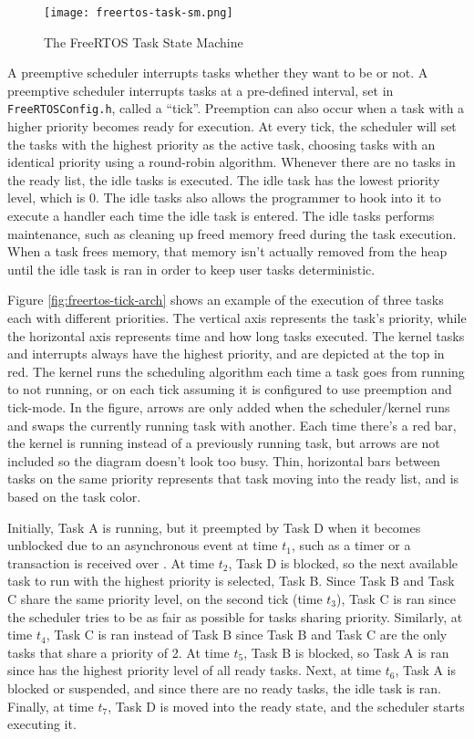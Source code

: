 \begin{figure}
\centering
\texttt{[image: freertos-task-sm.png]}
\caption{The FreeRTOS Task State Machine}
\label{fig:freertos-task-sm}
\end{figure}

A preemptive scheduler interrupts tasks whether they want to be or not. A
preemptive scheduler interrupts tasks at a pre-defined interval, set in
\texttt{FreeRTOSConfig.h}, called a ``tick''. Preemption can also occur when a task with
a higher priority becomes ready for execution. At every tick, the scheduler will
set the tasks with the highest priority as the active task, choosing tasks with
an identical priority using a round-robin algorithm. Whenever there are no tasks
in the ready list, the idle tasks is executed. The idle task has the lowest priority
level, which is 0. The idle tasks also allows the programmer to hook into it to execute a
handler each time the idle task is entered. The idle tasks performs maintenance,
such as cleaning up freed memory freed during the task execution. When a task
frees memory, that memory isn't actually removed from the heap until the idle
task is ran in order to keep user tasks deterministic.

Figure \ref{fig:freertos-tick-arch} shows an example of the execution of three tasks
each with different priorities. The vertical axis represents the task's
priority, while the horizontal axis represents time and how long tasks executed.
The kernel tasks and interrupts always have the highest priority, and are
depicted at the top in red. The kernel runs the scheduling algorithm each time a
task goes from running to not running, or on each tick assuming it is configured
to use preemption and tick-mode. In the figure, arrows are only added when the
scheduler/kernel runs and swaps the currently running task with another. Each
time there's a red bar, the kernel is running instead of a previously running
task, but arrows are not included so the diagram doesn't look too busy. Thin,
horizontal bars between tasks on the same priority represents that task moving
into the ready list, and is based on the task color.

 Initially, Task A is running, but it preempted by Task D when it becomes unblocked due to
an asynchronous event at time $t_1$, such as a timer or a transaction is
received over \iic. At time $t_2$, Task D is blocked, so the next
available task to run with the highest priority is selected, Task B.
Since Task B and Task C share the same priority level, on the
second tick (time $t_3$), Task C is ran since the scheduler tries to
be as fair as possible for tasks sharing priority.  Similarly, at time
$t_4$, Task C is ran instead of Task B since Task B and
Task C are the only tasks that share a priority of 2. At time $t_5$,
Task B is blocked, so Task A is ran since has the highest priority
level of all ready tasks.  Next, at time $t_6$, Task A is blocked or
suspended, and since there are no ready tasks, the idle task is ran. Finally, at
time $t_7$, Task D is moved into the ready state, and the scheduler
starts executing it.

